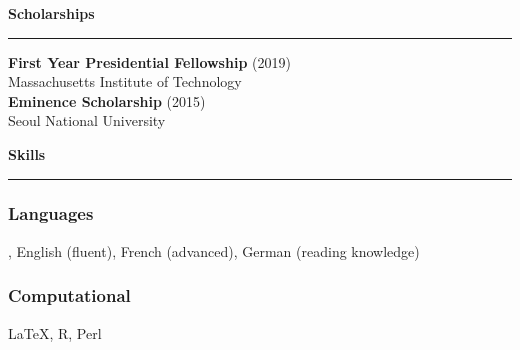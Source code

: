 \documentclass[11pt]{article}
\newcommand{\sect}[1]{{\fontsize{15}{25}\selectfont \textbf{#1}} {\vspace{0.1cm}} \hrule {\vspace{0.3cm}}}
\begin{document}
\vspace{1cm}

\sect{Scholarships}

\textbf{First Year Presidential Fellowship} (2019)\\{Massachusetts Institute of Technology}\\

{\textbf{Eminence Scholarship}} (2015)\\{Seoul National University}\\

\vspace{1cm}

\sect{Skills}

\subsubsection*{Languages}
, English (fluent), French (advanced), German (reading knowledge)
\subsubsection*{Computational}
 {\LaTeX}, R, Perl
\end{document}
